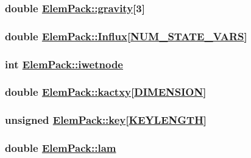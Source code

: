 \hypertarget{structElemPack_o39}{
\subsubsection[gravity]{\setlength{\rightskip}{0pt plus 5cm}double \hyperlink{structElemPack_o39}{Elem\-Pack::gravity}\mbox{[}3\mbox{]}}}
\label{structElemPack_o39}


\hypertarget{structElemPack_o44}{
\subsubsection[Influx]{\setlength{\rightskip}{0pt plus 5cm}double \hyperlink{structElemPack_o44}{Elem\-Pack::Influx}\mbox{[}\hyperlink{constant_8h_a45}{NUM\_\-STATE\_\-VARS}\mbox{]}}}
\label{structElemPack_o44}


\hypertarget{structElemPack_o19}{
\subsubsection[iwetnode]{\setlength{\rightskip}{0pt plus 5cm}int \hyperlink{structElemPack_o19}{Elem\-Pack::iwetnode}}}
\label{structElemPack_o19}


\hypertarget{structElemPack_o36}{
\subsubsection[kactxy]{\setlength{\rightskip}{0pt plus 5cm}double \hyperlink{structElemPack_o36}{Elem\-Pack::kactxy}\mbox{[}\hyperlink{constant_8h_a15}{DIMENSION}\mbox{]}}}
\label{structElemPack_o36}


\hypertarget{structElemPack_o20}{
\subsubsection[key]{\setlength{\rightskip}{0pt plus 5cm}unsigned \hyperlink{structElemPack_o20}{Elem\-Pack::key}\mbox{[}\hyperlink{constant_8h_a10}{KEYLENGTH}\mbox{]}}}
\label{structElemPack_o20}


\hypertarget{structElemPack_o41}{
\subsubsection[lam]{\setlength{\rightskip}{0pt plus 5cm}double \hyperlink{structElemPack_o41}{Elem\-Pack::lam}}}
\label{structElemPack_o41}


